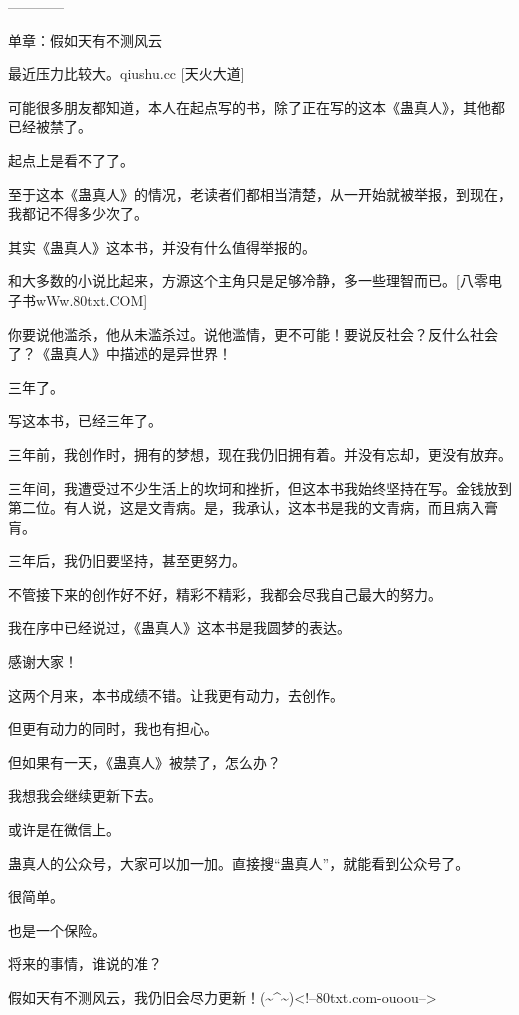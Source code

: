 \begin{this_body}
------------

单章：假如天有不测风云

最近压力比较大。qiushu.cc [天火大道]

可能很多朋友都知道，本人在起点写的书，除了正在写的这本《蛊真人》，其他都已经被禁了。

起点上是看不了了。

至于这本《蛊真人》的情况，老读者们都相当清楚，从一开始就被举报，到现在，我都记不得多少次了。

其实《蛊真人》这本书，并没有什么值得举报的。

和大多数的小说比起来，方源这个主角只是足够冷静，多一些理智而已。[八零电子书wWw.80txt.COM]

你要说他滥杀，他从未滥杀过。说他滥情，更不可能！要说反社会？反什么社会了？《蛊真人》中描述的是异世界！

三年了。

写这本书，已经三年了。

三年前，我创作时，拥有的梦想，现在我仍旧拥有着。并没有忘却，更没有放弃。

三年间，我遭受过不少生活上的坎坷和挫折，但这本书我始终坚持在写。金钱放到第二位。有人说，这是文青病。是，我承认，这本书是我的文青病，而且病入膏肓。

三年后，我仍旧要坚持，甚至更努力。

不管接下来的创作好不好，精彩不精彩，我都会尽我自己最大的努力。

我在序中已经说过，《蛊真人》这本书是我圆梦的表达。

感谢大家！

这两个月来，本书成绩不错。让我更有动力，去创作。

但更有动力的同时，我也有担心。

但如果有一天，《蛊真人》被禁了，怎么办？

我想我会继续更新下去。

或许是在微信上。

蛊真人的公众号，大家可以加一加。直接搜“蛊真人”，就能看到公众号了。

很简单。

也是一个保险。

将来的事情，谁说的准？

假如天有不测风云，我仍旧会尽力更新！(\~{}\^{}\~{})<!--80txt.com-ouoou-->

\end{this_body}

